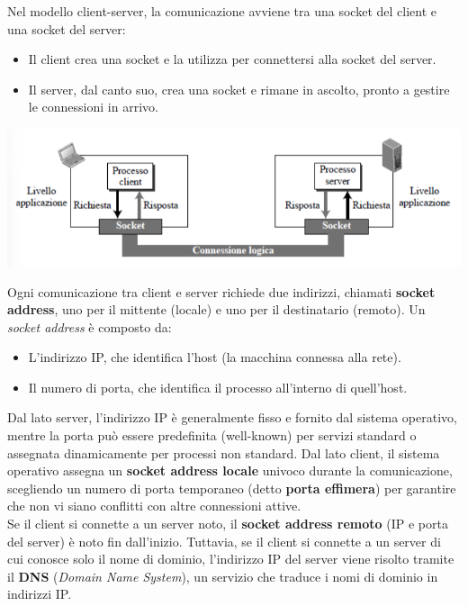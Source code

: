 \documentclass[12pt]{report}
\begin{document}
	Nel modello client-server, la comunicazione avviene tra una socket del client e una socket del server:
	\begin{itemize}
		\item Il client crea una socket e la utilizza per connettersi alla socket del server.
		\item Il server, dal canto suo, crea una socket e rimane in ascolto, pronto a gestire le connessioni in arrivo.
	\end{itemize}
	\begin{center}
		\includegraphics[scale=0.5]{assets/socket-comm.png}
	\end{center}
	Ogni comunicazione tra client e server richiede due indirizzi, chiamati \textbf{socket address}, uno per il mittente (locale) e uno per il destinatario (remoto). Un \textit{socket address} è composto da:
	\begin{itemize}
		\item L'indirizzo IP, che identifica l'host (la macchina connessa alla rete).
		\item Il numero di porta, che identifica il processo all'interno di quell'host.
	\end{itemize}
	Dal lato server, l'indirizzo IP è generalmente fisso e fornito dal sistema operativo, mentre la porta può essere predefinita (well-known) per servizi standard o assegnata dinamicamente per processi non standard. Dal lato client, il sistema operativo assegna un \textbf{socket address locale} univoco durante la comunicazione, scegliendo un numero di porta temporaneo (detto \textbf{porta effimera}) per garantire che non vi siano conflitti con altre connessioni attive.
	\vspace{\baselineskip}\\
	Se il client si connette a un server noto, il \textbf{socket address remoto} (IP e porta del server) è noto fin dall'inizio. Tuttavia, se il client si connette a un server di cui conosce solo il nome di dominio, l'indirizzo IP del server viene risolto tramite il \textbf{DNS} (\textit{Domain Name System}), un servizio che traduce i nomi di dominio in indirizzi IP.
	\vspace{\baselineskip}\\
\end{document}
